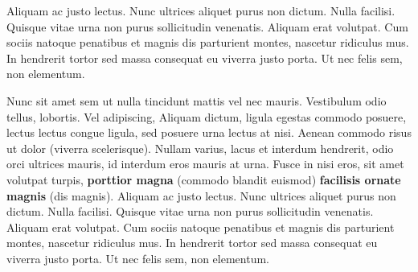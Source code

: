 \documentclass[a0paper,landscape]{baposter}
\begin{document}
\begin{poster}
{%

Aliquam ac justo lectus. Nunc ultrices aliquet purus non dictum. Nulla facilisi. 
Quisque vitae urna non purus sollicitudin venenatis. Aliquam erat volutpat. Cum 
sociis natoque penatibus et magnis dis parturient montes, nascetur ridiculus 
mus. In hendrerit tortor sed massa consequat eu viverra justo porta. Ut nec 
felis sem, non elementum.


\begin{center}
\end{center}


Nunc sit amet sem ut nulla tincidunt mattis vel nec mauris. Vestibulum odio 
tellus, lobortis. Vel adipiscing, Aliquam dictum, ligula egestas commodo 
posuere, lectus lectus congue ligula, sed posuere urna lectus at nisi. Aenean 
commodo risus ut dolor (viverra scelerisque). Nullam varius, lacus et interdum 
hendrerit, odio orci ultrices mauris, id interdum eros mauris at urna. Fusce in 
nisi eros, sit amet volutpat turpis, \textbf{porttior magna} (commodo blandit 
euismod) \textbf{facilisis ornate magnis} (dis magnis). Aliquam ac justo lectus. 
Nunc ultrices aliquet purus non dictum. Nulla facilisi. Quisque vitae urna non 
purus sollicitudin venenatis. Aliquam erat volutpat. Cum sociis natoque 
penatibus et magnis dis parturient montes, nascetur ridiculus mus. In hendrerit 
tortor sed massa consequat eu viverra justo porta. Ut nec felis sem, non 
elementum.
}


\end{poster}
\end{document}
